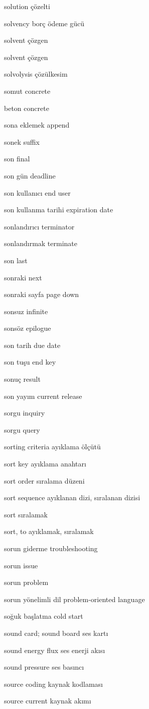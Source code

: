 \documentclass[12pt,fleqn]{article}\usepackage{../../common}
\begin{document}
solution çözelti

solvency borç ödeme gücü

solvent çözgen

solvent çözgen

solvolysis çözülkesim

somut concrete

beton concrete

sona eklemek append

sonek suffix

son final

son gün deadline

son kullanıcı end user

son kullanma tarihi expiration date

sonlandırıcı terminator

sonlandırmak terminate

son last

sonraki next

sonraki sayfa page down

sonsuz infinite

sonsöz epilogue

son tarih due date

son tuşu end key

sonuç result

son yayım current release

sorgu inquiry

sorgu query

sorting criteria ayıklama ölçütü

sort key ayıklama anahtarı

sort order sıralama düzeni

sort sequence ayıklanan dizi, sıralanan dizisi

sort sıralamak

sort, to ayıklamak, sıralamak

sorun giderme troubleshooting

sorun issue

sorun problem

sorun yönelimli dil problem-oriented language

soğuk başlatma cold start

sound card; sound board ses kartı

sound energy flux ses enerji akısı

sound pressure ses basıncı

source coding kaynak kodlaması

source current kaynak akımı
\end{document}
